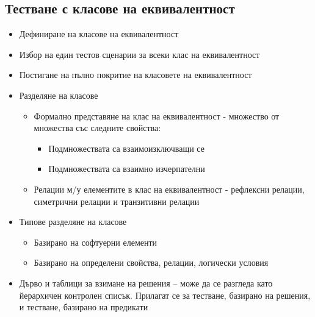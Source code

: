 \documentclass[fleqn,12pt]{article}
\begin{document}
\begin{flushleft}
    \subsection{Тестване с класове на еквивалентност}
        \begin{itemize}
            \item Дефиниране на класове на еквивалентност
            \item Избор на един тестов сценарии за всеки клас на еквивалентност
            \item Постигане на пълно покритие на класовете на еквивалентност
            \item Разделяне на класове
                \begin{itemize}
                    \item Формално представяне на клас на еквивалентност - множество от множества със следните свойства:
                        \begin{itemize}
                            \item Подмножествата са взаимоизключващи се
                            \item Подмножествата са взаимно изчерпателни
                        \end{itemize}
                    \item Релации м/у елементите в клас на еквивалентност - рефлексни релации, симетрични релации и транзитивни релации
                \end{itemize}
            \item Типове разделяне на класове
                \begin{itemize}
                    \item Базирано на софтуерни елементи
                    \item Базирано на определени свойства, релации, логически условия
                \end{itemize}
            \item Дърво и таблици за взимане на решения -- може да се разгледа като йерархичен контролен списък. Прилагат се за тестване, базирано на решения, и тестване, базирано на предикати
        \end{itemize}

\end{flushleft}
\end{document}
